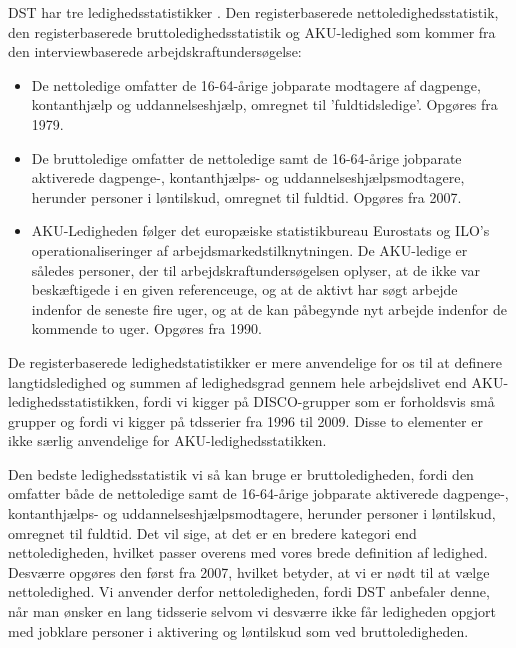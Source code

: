 DST har tre ledighedsstatistikker \parencite{DST2014}. Den registerbaserede nettoledighedsstatistik, den registerbaserede bruttoledighedsstatistik og AKU-ledighed som kommer fra den interviewbaserede arbejdskraftundersøgelse:
\begin{itemize} [topsep=6pt,itemsep=-1ex]
  \item De nettoledige omfatter de 16-64-årige jobparate modtagere af dagpenge, kontanthjælp og uddannelseshjælp, omregnet til ’fuldtidsledige’. Opgøres fra 1979.
  \item De bruttoledige omfatter de nettoledige samt de 16-64-årige jobparate aktiverede dagpenge-, kontanthjælps- og uddannelseshjælpsmodtagere, herunder personer i løntilskud, omregnet til fuldtid. Opgøres fra 2007.
  \item AKU-Ledigheden følger det europæiske statistikbureau Eurostats og ILO’s operationaliseringer af arbejdsmarkedstilknytningen. De AKU-ledige er således personer, der til arbejdskraftundersøgelsen oplyser, at de ikke var beskæftigede i en given referenceuge, og at de aktivt har søgt arbejde indenfor de seneste fire uger, og at de kan påbegynde nyt arbejde indenfor de kommende to uger. Opgøres fra 1990.
\end{itemize}

De registerbaserede ledighedstatistikker er mere anvendelige for os til at definere langtidsledighed og summen af ledighedsgrad gennem hele arbejdslivet end AKU-ledighedsstatistikken, fordi vi kigger på DISCO-grupper som er forholdsvis små grupper og fordi vi kigger på tdsserier fra 1996 til 2009. Disse to elementer er ikke særlig anvendelige for AKU-ledighedsstatikken.

Den bedste ledighedsstatistik vi så kan bruge er bruttoledigheden, fordi den omfatter både de nettoledige samt de 16-64-årige jobparate aktiverede dagpenge-, kontanthjælps- og uddannelseshjælpsmodtagere, herunder personer i løntilskud, omregnet til fuldtid. Det vil sige, at det er en bredere kategori end nettoledigheden, hvilket passer overens med vores brede definition af ledighed. Desværre opgøres den først fra 2007, hvilket betyder, at vi er nødt til at vælge nettoledighed. Vi anvender derfor nettoledigheden, fordi DST anbefaler denne, når man ønsker en lang tidsserie selvom vi desværre ikke får ledigheden opgjort med jobklare personer i aktivering og løntilskud som ved bruttoledigheden.

